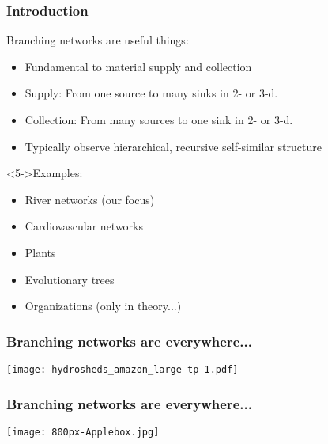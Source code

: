 \begin{frame}[label=]
  \frametitle{Introduction}

  \begin{block}{Branching networks are useful things:}
    \begin{itemize}
    \item<1-> Fundamental to material \alert{supply and collection}
    \item<2-> \alert{Supply:} From one source to many sinks in 2- or 3-d.
    \item<3-> \alert{Collection:} From many sources to one sink in 2- or 3-d.
    \item<4-> Typically observe hierarchical, recursive self-similar structure
    \end{itemize}
  \end{block}

  \begin{block}<5->{Examples:}
    \begin{itemize}
    \item<6-> River networks (our focus)
    \item<7-> Cardiovascular networks
    \item<8-> Plants
    \item<9-> Evolutionary trees
    \item<10-> Organizations (only in theory...)
    \end{itemize}
  \end{block}

\end{frame}

\begin{frame}[label=]
  \frametitle{Branching networks are everywhere...}

  \begin{center}
    \texttt{[image: hydrosheds\_amazon\_large-tp-1.pdf]}\\
    {\tiny {}}
  \end{center}

\end{frame}

\begin{frame}[label=]
  \frametitle{Branching networks are everywhere...}

  \begin{center}
    \texttt{[image: 800px-Applebox.jpg]}\\
    {\tiny {}}
  \end{center}

\end{frame}

